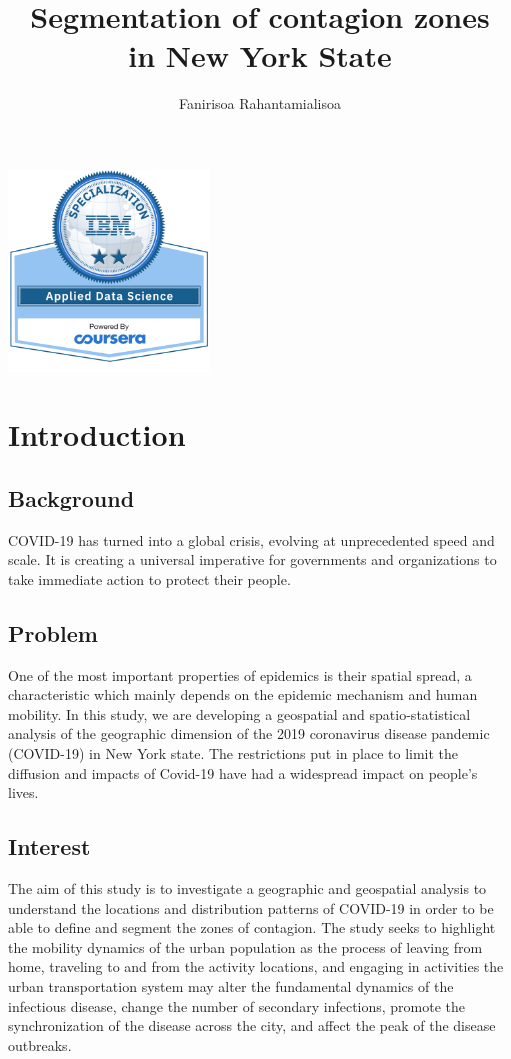 \documentclass{article}
\title{Segmentation of contagion zones \\ in New York State}
\author{Fanirisoa Rahantamialisoa}
\begin{document}
\maketitle
   \begin{center}
   \includegraphics[width=0.4\textwidth]{Specialization}
   \end{center}

\section{Introduction}

\subsection{Background}
COVID-19 has turned into a global crisis, evolving at unprecedented speed and scale. It is creating a universal imperative for governments and organizations to take immediate action to protect their people. 

\subsection{Problem}
One of the most important properties of epidemics is their spatial spread, a characteristic which mainly depends on the epidemic mechanism and human mobility. In this study, we are developing a geospatial and spatio-statistical analysis of the geographic dimension of the 2019 coronavirus disease pandemic (COVID-19) in New York state. The restrictions put in place to limit the diffusion and impacts of Covid-19 have had a widespread impact on people’s lives.

\subsection{ Interest}
The aim of this study is to investigate a geographic and geospatial analysis to understand the locations and distribution patterns of COVID-19 in order to be able to define and segment the zones of contagion. The study seeks to highlight the mobility dynamics of the urban population as the process of leaving from home, traveling to and from the activity locations, and engaging in activities the urban transportation system may alter the fundamental dynamics of the infectious disease, change the number of secondary infections, promote the synchronization of the disease across the city, and affect the peak of the disease outbreaks.
\end{document}
